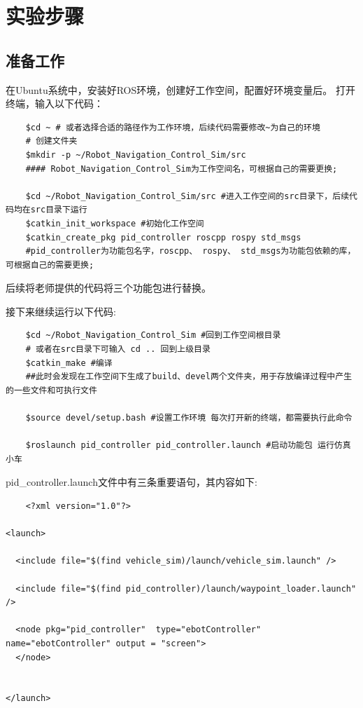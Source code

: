 \documentclass{xjtureport}
\begin{document}
\section{实验步骤}

\subsection{准备工作}
在Ubuntu系统中，安装好ROS环境，创建好工作空间，配置好环境变量后。
打开终端，输入以下代码：
\begin{lstlisting}
    $cd ~ # 或者选择合适的路径作为工作环境，后续代码需要修改~为自己的环境 
    # 创建文件夹
    $mkdir -p ~/Robot_Navigation_Control_Sim/src
    #### Robot_Navigation_Control_Sim为工作空间名，可根据自己的需要更换;

    $cd ~/Robot_Navigation_Control_Sim/src #进入工作空间的src目录下，后续代码均在src目录下运行
    $catkin_init_workspace #初始化工作空间
    $catkin_create_pkg pid_controller roscpp rospy std_msgs
    #pid_controller为功能包名字，roscpp、 rospy、 std_msgs为功能包依赖的库，可根据自己的需要更换;
\end{lstlisting}
后续将老师提供的代码将三个功能包进行替换。

接下来继续运行以下代码:
\begin{lstlisting}
    $cd ~/Robot_Navigation_Control_Sim #回到工作空间根目录 
    # 或者在src目录下可输入 cd .. 回到上级目录
    $catkin_make #编译
    ##此时会发现在工作空间下生成了build、devel两个文件夹，用于存放编译过程中产生的一些文件和可执行文件

    $source devel/setup.bash #设置工作环境 每次打开新的终端，都需要执行此命令

    $roslaunch pid_controller pid_controller.launch #启动功能包 运行仿真小车
\end{lstlisting}

pid\_controller.launch文件中有三条重要语句，其内容如下:

\begin{lstlisting}
    <?xml version="1.0"?>

<launch>

  <include file="$(find vehicle_sim)/launch/vehicle_sim.launch" />

  <include file="$(find pid_controller)/launch/waypoint_loader.launch" />

  <node pkg="pid_controller"  type="ebotController" name="ebotController" output = "screen">
  </node>


</launch>
\end{lstlisting}
\end{document}
